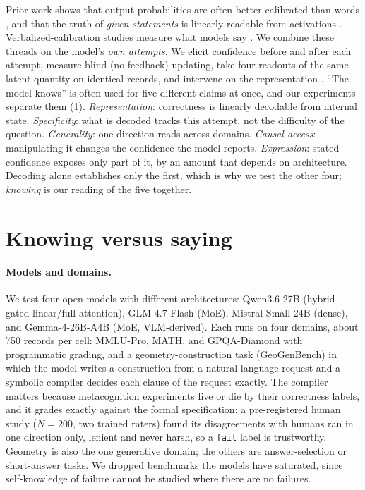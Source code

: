 \documentclass{article}
\begin{document}
Prior work shows that output probabilities are often better calibrated than words \citep{kadavath2022language}, and that the truth of \emph{given statements} is linearly readable from activations \citep{azaria2023internal, burns2023discovering, marks2024geometry}.
Verbalized-calibration studies measure what models say \citep{lin2022teaching, tian2023just}.
We combine these threads on the model's \emph{own attempts}.
We elicit confidence before and after each attempt, measure blind (no-feedback) updating, take four readouts of the same latent quantity on identical records, and intervene on the representation \citep{zou2023representation}.
``The model knows'' is often used for five different claims at once, and our experiments separate them (\cref{sec:knowing}).
\emph{Representation}: correctness is linearly decodable from internal state.
\emph{Specificity}: what is decoded tracks this attempt, not the difficulty of the question.
\emph{Generality}: one direction reads across domains.
\emph{Causal access}: manipulating it changes the confidence the model reports.
\emph{Expression}: stated confidence exposes only part of it, by an amount that depends on architecture.
Decoding alone establishes only the first, which is why we test the other four; \emph{knowing} is our reading of the five together.

\section{Knowing versus saying}
\label{sec:knowing}

\paragraph{Models and domains.}
We test four open models with different architectures: Qwen3.6-27B (hybrid gated linear/full attention), GLM-4.7-Flash (MoE), Mistral-Small-24B (dense), and Gemma-4-26B-A4B (MoE, VLM-derived).
Each runs on four domains, about 750 records per cell: MMLU-Pro, MATH, and GPQA-Diamond with programmatic grading, and a geometry-construction task (GeoGenBench) in which the model writes a construction from a natural-language request and a symbolic compiler decides each clause of the request exactly.
The compiler matters because metacognition experiments live or die by their correctness labels, and it grades exactly against the formal specification: a pre-registered human study ($N{=}200$, two trained raters) found its disagreements with humans ran in one direction only, lenient and never harsh, so a \texttt{fail} label is trustworthy.
Geometry is also the one generative domain; the others are answer-selection or short-answer tasks.
We dropped benchmarks the models have saturated, since self-knowledge of failure cannot be studied where there are no failures.
\end{document}
